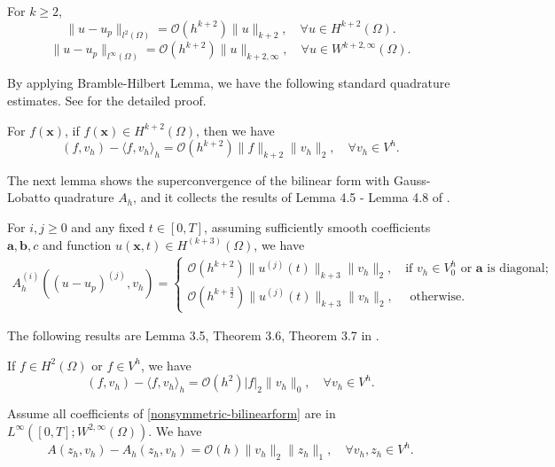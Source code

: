 \documentclass[onefignum,onetabnum]{siamart171218}
\begin{document}
\begin{theorem}
\label{thm-superapproximation}
For $k \geq 2$, 
 \[\|u-u_p\|_{l^2(\Omega)}=\mathcal O(h^{k+2}) \|u\|_{k+2},\quad\forall u\in H^{k+2}(\Omega).\]
 \[\|u-u_p\|_{l^{\infty}(\Omega)}=\mathcal O(h^{k+2}) \|u\|_{k+2,\infty},
 \quad\forall u\in W^{k+2,\infty}(\Omega).\]
\end{theorem}

By applying Bramble-Hilbert Lemma, we have the following standard quadrature estimates. See \cite{li2020superconvergence1} for the detailed proof. 
\begin{lemma}
\label{rhs-estimate}
 For $f(\mathbf x)$, if $f(\mathbf x) \in H^{k+2}(\Omega)$, then we have $$(f,v_h)-\langle f,v_h\rangle_h =\mathcal O(h^{k+2}) \|f\|_{k+2} \|v_h\|_2,\quad \forall v_h\in V^h.$$
\end{lemma}

The next lemma shows the superconvergence of the bilinear form with Gauss-Lobatto quadrature $A_h$, and it collects the results of Lemma 4.5 - Lemma 4.8 of \cite{li2020superconvergence}.
\begin{lemma}\label{bilinear-u-up}
For $i,j \geq 0$ and any fixed $t\in[0,T]$, assuming sufficiently smooth coefficients $\mathbf a,\mathbf b, c$ and function $u(\mathbf x,t)\in H^{(k+3)}(\Omega)$, we have
\begin{align}
\label{bilinear-form-estimate}
A^{(i)}_h((u-u_p)^{(j)},v_h)=\begin{cases}
                         \mathcal O(h^{k+2})\|u^{(j)}(t)\|_{k+3}\|v_h\|_2,\quad \text{if } v_h\in V^h_0 \text{ or $\mathbf a$ is diagonal;}  \\
                         \mathcal O(h^{k+\frac{3}{2}})\|u^{(j)}(t)\|_{k+3}\|v_h\|_2,\quad \text{ otherwise.}
                        \end{cases}
\end{align}
\end{lemma}
 

The following results are Lemma 3.5, Theorem 3.6, Theorem 3.7 in \cite{li2020superconvergence}.

\begin{lemma}
\label{lemma-quaderror-2norm}
 If $f\in H^{2}(\Omega)$ or $f\in V^h$, we have $$(f,v_h)-\langle f,v_h\rangle_h =\mathcal O(h^2) |f|_{2} \|v_h\|_0,\quad\forall v_h\in V^h.$$
\end{lemma}

\begin{lemma}\label{a-ah-1norm}
Assume all coefficients of \eqref{nonsymmetric-bilinearform} are in $L^{\infty}\left([0,T];W^{2,\infty}(\Omega)\right)$. We have 
\[ A(z_h,v_h)-A_h(z_h,v_h)=\mathcal O(h) \|v_h\|_2 \|z_h\|_1, \quad\forall v_h,z_h\in V^h.\]
\end{lemma}
\end{document}
